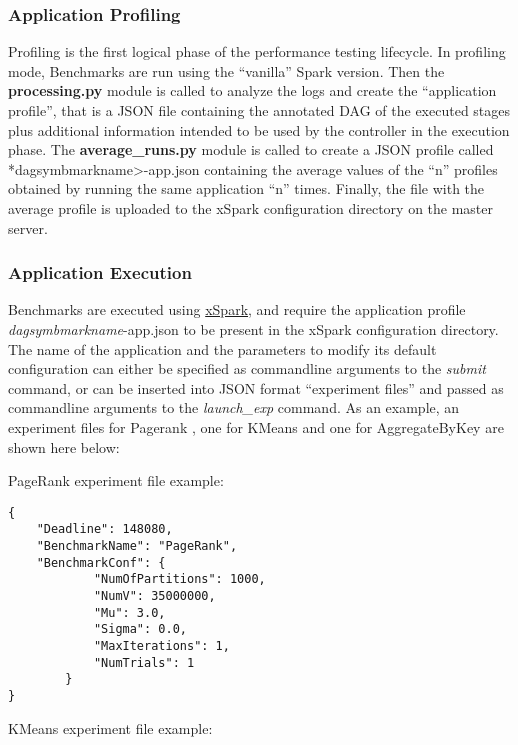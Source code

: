 \documentclass[
]{article}
\begin{document}
\hypertarget{application-profiling}{%
\subsubsection{Application Profiling}\label{application-profiling}}

Profiling is the first logical phase of the performance testing
lifecycle. In profiling mode, Benchmarks are run using the ``vanilla''
Spark version. Then the \textbf{processing.py} module is called to
analyze the logs and create the ``application profile'', that is a JSON
file containing the annotated DAG of the executed stages plus additional
information intended to be used by the controller in the execution
phase. The \textbf{average\_runs.py} module is called to create a JSON
profile called *dagsymbmarkname\textgreater-app.json containing the
average values of the ``n'' profiles obtained by running the same
application ``n'' times. Finally, the file with the average profile is
uploaded to the xSpark configuration directory on the master server.

\hypertarget{application-execution}{%
\subsubsection{Application Execution}\label{application-execution}}

Benchmarks are executed using
\href{https://github.com/gioenn/xSpark.git}{xSpark}, and require the
application profile \emph{dagsymbmarkname}-app.json to be present in the
xSpark configuration directory. The name of the application and the
parameters to modify its default configuration can either be specified
as commandline arguments to the \emph{submit} command, or can be
inserted into JSON format ``experiment files'' and passed as commandline
arguments to the \emph{launch\_exp} command. As an example, an
experiment files for Pagerank , one for KMeans and one for
AggregateByKey are shown here below:

PageRank experiment file example:

\begin{verbatim}
{
    "Deadline": 148080,
    "BenchmarkName": "PageRank",
    "BenchmarkConf": {
            "NumOfPartitions": 1000,
            "NumV": 35000000,
            "Mu": 3.0,
            "Sigma": 0.0,
            "MaxIterations": 1,
            "NumTrials": 1     
        }
}
\end{verbatim}

KMeans experiment file example:
\end{document}

